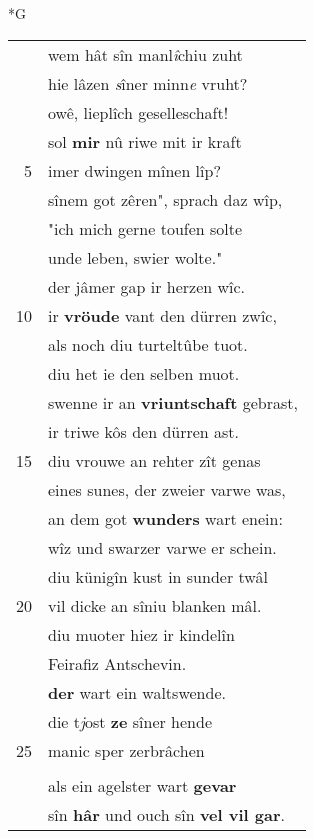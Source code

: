 \documentclass[8pt,a4paper,notitlepage]{article}
\begin{document}
\newpage
\begin{table}[ht]
\begin{minipage}[t]{0.5\linewidth}
\small
\begin{center}*G
\end{center}
\begin{tabular}{rl}
 & wem hât sîn manl\textit{î}chiu zuht\\ 
 & hie lâzen \textit{s}îner minn\textit{e} vruht?\\ 
 & owê, lieplîch geselleschaft!\\ 
 & sol \textbf{mir} nû riwe mit ir kraft\\ 
5 & imer dwingen mînen lîp?\\ 
 & sînem got zêren", sprach daz wîp,\\ 
 & "ich mich gerne toufen solte\\ 
 & unde leben, swier wolte."\\ 
 & der jâmer gap ir herzen wîc.\\ 
10 & ir \textbf{vröude} vant den dürren zwîc,\\ 
 & als noch diu turteltûbe tuot.\\ 
 & diu het ie den selben muot.\\ 
 & swenne ir an \textbf{vriuntschaft} gebrast,\\ 
 & ir triwe kôs den dürren ast.\\ 
15 & diu vrouwe an rehter zît genas\\ 
 & eines sunes, der zweier varwe was,\\ 
 & an dem got \textbf{wunders} wart enein:\\ 
 & wîz und swarzer varwe er schein.\\ 
 & diu künigîn kust in sunder twâl\\ 
20 & vil dicke an sîniu blanken mâl.\\ 
 & diu muoter hiez ir kindelîn\\ 
 & Feirafiz Antschevin.\\ 
 & \textbf{der} wart ein waltswende.\\ 
 & die t\textit{j}ost \textbf{ze} sîner hende\\ 
25 & manic sper zerbrâchen\\ 
 & \textbf{\begin{large}U\end{large}nd} schilte \textbf{dürkel stâchen}.\\ 
 & als ein agelster wart \textbf{gevar}\\ 
 & sîn \textbf{hâr} und ouch sîn \textbf{vel vil gar}.\\ 

\end{tabular}
\end{minipage}
\end{table}
\end{document}

